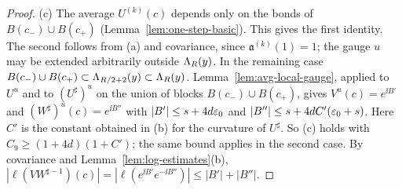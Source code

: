 \begin{proof}
(c) The average $U^{(k)}(c)$ depends only on the bonds of $B(c_-)\cup B(c_+)$ (Lemma~\ref{lem:one-step-basic}). This gives the first identity. The second follows from (a) and covariance, since $\mathfrak a^{(k)}(1)=1$; the gauge $u$ may be extended arbitrarily outside $\Lambda_R(y)$. In the remaining case $B(c_-)\cup B(c_+)\subset\Lambda_{R/2+2}(y)\subset\Lambda_R(y)$. Lemma~\ref{lem:avg-local-gauge}, applied to $U^u$ and to $(U^\sharp)^u$ on the union of blocks $B(c_-)\cup B(c_+)$, gives $V^u(c)=e^{\ii B'}$ and $(W^\sharp)^u(c)=e^{\ii B''}$ with $|B'|\le s+4d\varepsilon_0$ and $|B''|\le s+4dC'(\varepsilon_0+s)$. Here $C'$ is the constant obtained in (b) for the curvature of $U^\sharp$. So (c) holds with $C_9\ge(1+4d)(1+C')$; the same bound applies in the second case. By covariance and Lemma~\ref{lem:log-estimates}(b), $|\ell(VW^{\sharp-1})(c)|=|\ell(e^{\ii B'}e^{-\ii B''})|\le|B'|+|B''|$.
\end{proof}
